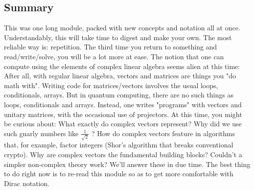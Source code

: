 \documentclass[main.tex]{subfiles}
\begin{document}
\subsection{Summary}

    This was one long module, packed with new concepts and notation all at once. Understandably, this will take time to digest and make your own. The most reliable way is: repetition. The third time you return to something and read/write/solve, you will be a lot more at ease. The notion that one can compute using the elements of complex linear algebra seems alien at this time: After all, with regular linear algebra, vectors and matrices are things you "do math with". Writing code for matrices/vectors involves the usual loops, conditionals, arrays. But in quantum computing, there are no such things as loops, conditionals and arrays. Instead, one writes "programs" with vectors and unitary matrices, with the occasional use of projectors. At this time, you might be curious about: What exactly do complex vectors represent? Why did we use such gnarly numbers like $\frac{1}{\sqrt{2}}$ ? How do complex vectors feature in algorithms that, for example, factor integers (Shor's algorithm that breaks conventional crypto). Why are complex vectors the fundamental building blocks? Couldn't a simpler non-complex theory work? We'll answer these in due time. The best thing to do right now is to re-read this module so as to get more comfortable with Dirac notation.
\end{document}
